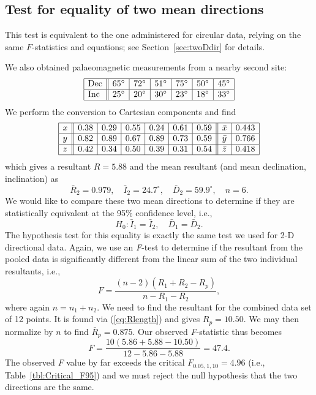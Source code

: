 \subsection{Test for equality of two mean directions}
This test is equivalent to the one administered for circular data, relying on the same $F$-statistics and
equations; see Section~\ref{sec:twoDdir} for details.
\begin{example}
We also obtained palaeomagnetic measurements from a nearby second site:
$$
\begin{array}{|l||r|r|r|r|r|r|} \hline
\mbox{Dec} & 65^{\circ} & 72^{\circ} & 51^{\circ} & 75^{\circ} & 50^{\circ} & 45^{\circ} \\ \hline
\mbox{Inc} & 25^{\circ} & 20^{\circ} & 30^{\circ} & 23^{\circ} & 18^{\circ} & 33^{\circ} \\ \hline
\end{array}
$$
We perform the conversion to Cartesian components and find
$$
\begin{array}{|l||r|r|r|r|r|r||l|r|}
\hline
x & 0.38 & 0.29 & 0.55 & 0.24 & 0.61 & 0.59 & \bar{x} & 0.443 \\ \hline
y & 0.82 & 0.89 & 0.67 & 0.89 & 0.73 & 0.59 & \bar{y} & 0.766 \\ \hline
z & 0.42 & 0.34 & 0.50 & 0.39 & 0.31 & 0.54 & \bar{z} & 0.418 \\ \hline
\end{array}
$$
which gives a resultant $R = 5.88$ and the mean resultant (and mean declination, inclination) as
\begin{equation}
\bar{R}_2 = 0.979, \quad \bar{I}_2 = 24.7^{\circ},  \quad \bar{D}_2 = 59.9^{\circ},  \quad n = 6.
\end{equation}
We would like to compare these two mean directions to determine if they are statistically equivalent at the 95\% 
confidence level, i.e.,
\begin{equation}
H_0: \bar{I}_1 = \bar{I}_2, \quad \bar{D}_1 = \bar{D}_2.
\end{equation}
The hypothesis test for this equality is exactly the same test we used for 2-D directional data.  Again, we use 
an \emph{F}-test to determine if the resultant from the pooled data is significantly different from the linear 
sum of the two individual resultants, i.e.,
\begin{equation}
F= \frac{(n - 2) (R_1 + R_2 - R_p)}{n - R_1 - R_2},
\end{equation}
where again $n = n_1 + n_2$.  We need to find the resultant for the combined data set of 12 points.  It is found via (\ref{eq:Rlength}) and
gives $R_p = 10.50$.
We may then normalize by $n$ to find $\bar{R}_p = 0.875$.  Our observed \emph{F}-statistic thus becomes
\begin{equation}
F = \frac{10(5.86 + 5.88 - 10.50)}{12 - 5.86 - 5.88} = 47.4.
\end{equation}	 
The observed \emph{F} value by far exceeds the critical $F_{0.05,1,10} = 4.96$ (i.e., Table~\ref{tbl:Critical_F95})
and we must reject the null hypothesis that the two directions are the same.
\end{example}

